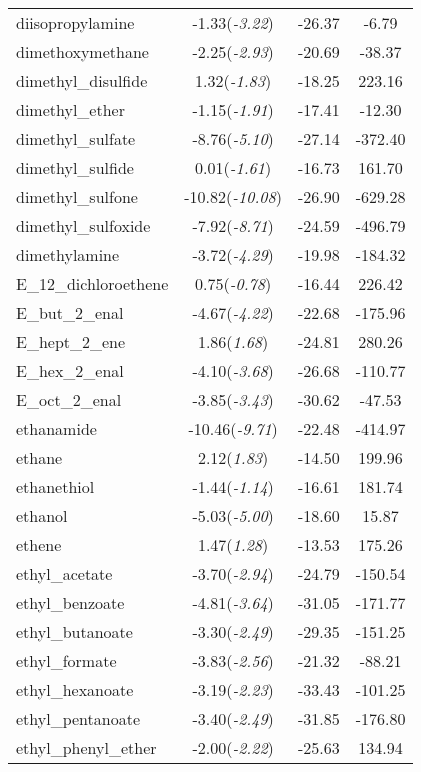 \documentclass{amsart}
\begin{document}
\begin{center}
\begin{longtable}{l|c|c|c}
diisopropylamine & -1.33(\textit{-3.22}) & -26.37 & -6.79 \\ 
dimethoxymethane & -2.25(\textit{-2.93}) & -20.69 & -38.37 \\ 
dimethyl\_disulfide & 1.32(\textit{-1.83}) & -18.25 & 223.16 \\ 
dimethyl\_ether & -1.15(\textit{-1.91}) & -17.41 & -12.30 \\ 
dimethyl\_sulfate & -8.76(\textit{-5.10}) & -27.14 & -372.40 \\ 
dimethyl\_sulfide & 0.01(\textit{-1.61}) & -16.73 & 161.70 \\ 
dimethyl\_sulfone & -10.82(\textit{-10.08}) & -26.90 & -629.28 \\ 
dimethyl\_sulfoxide & -7.92(\textit{-8.71}) & -24.59 & -496.79 \\ 
dimethylamine & -3.72(\textit{-4.29}) & -19.98 & -184.32 \\ 
E\_12\_dichloroethene & 0.75(\textit{-0.78}) & -16.44 & 226.42 \\ 
E\_but\_2\_enal & -4.67(\textit{-4.22}) & -22.68 & -175.96 \\ 
E\_hept\_2\_ene & 1.86(\textit{1.68}) & -24.81 & 280.26 \\ 
E\_hex\_2\_enal & -4.10(\textit{-3.68}) & -26.68 & -110.77 \\ 
E\_oct\_2\_enal & -3.85(\textit{-3.43}) & -30.62 & -47.53 \\ 
ethanamide & -10.46(\textit{-9.71}) & -22.48 & -414.97 \\ 
ethane & 2.12(\textit{1.83}) & -14.50 & 199.96 \\ 
ethanethiol & -1.44(\textit{-1.14}) & -16.61 & 181.74 \\ 
ethanol & -5.03(\textit{-5.00}) & -18.60 & 15.87 \\ 
ethene & 1.47(\textit{1.28}) & -13.53 & 175.26 \\ 
ethyl\_acetate & -3.70(\textit{-2.94}) & -24.79 & -150.54 \\ 
ethyl\_benzoate & -4.81(\textit{-3.64}) & -31.05 & -171.77 \\ 
ethyl\_butanoate & -3.30(\textit{-2.49}) & -29.35 & -151.25 \\ 
ethyl\_formate & -3.83(\textit{-2.56}) & -21.32 & -88.21 \\ 
ethyl\_hexanoate & -3.19(\textit{-2.23}) & -33.43 & -101.25 \\ 
ethyl\_pentanoate & -3.40(\textit{-2.49}) & -31.85 & -176.80 \\ 
ethyl\_phenyl\_ether & -2.00(\textit{-2.22}) & -25.63 & 134.94 \\ 

\end{longtable}
\end{center}
\end{document}
